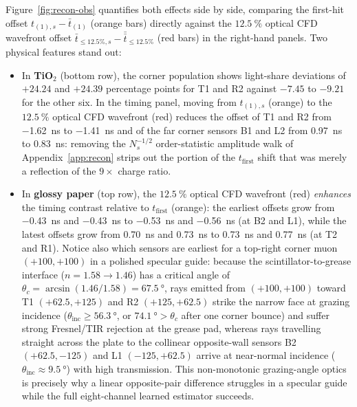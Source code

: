 \documentclass[11pt,a4paper]{article}
\begin{document}
Figure~\ref{fig:recon-obs} quantifies both effects side by side, comparing the
first-hit offset $t_{(1),s} - \bar t_{(1)}$ (orange bars) directly against the
$\SI{12.5}{\percent}$ optical CFD wavefront offset
$\bar t_{\le 12.5\%,s} - \bar{\bar t}_{\le 12.5\%}$ (red bars) in the right-hand
panels.  Two physical features stand out:
\begin{itemize}
  \item In \textbf{TiO$_2$} (bottom row), the corner population shows light-share
        deviations of $+24.24$ and $+24.39$ percentage points for T1 and R2 against
        $-7.45$ to $-9.21$ for the other six.  In the timing panel, moving from
        $t_{(1),s}$ (orange) to the $\SI{12.5}{\percent}$ optical CFD wavefront
        (red) reduces the offset of T1 and R2 from \SI{-1.62}{\nano\second} to
        \SI{-1.41}{\nano\second} and of the far corner sensors B1 and L2 from
        \SI{+0.97}{\nano\second} to \SI{+0.83}{\nano\second}: removing the
        $N_s^{-1/2}$ order-statistic amplitude walk of
        Appendix~\ref{app:recon}
        strips out the portion of the $t_{\mathrm{first}}$ shift that was merely
        a reflection of the $9\times$ charge ratio.
  \item In \textbf{glossy paper} (top row), the $\SI{12.5}{\percent}$ optical
        CFD wavefront (red) \emph{enhances} the timing contrast relative to
        $t_{\mathrm{first}}$ (orange): the earliest offsets grow from
        \SI{-0.43}{\nano\second} and \SI{-0.43}{\nano\second} to
        \SI{-0.53}{\nano\second} and \SI{-0.56}{\nano\second} (at B2 and L1),
        while the latest offsets grow from \SI{+0.70}{\nano\second} and
        \SI{+0.73}{\nano\second} to \SI{+0.73}{\nano\second} and
        \SI{+0.77}{\nano\second} (at T2 and R1).  Notice also which sensors are
        earliest for a top-right corner muon $(+100,+100)$ in a polished
        specular guide: because the scintillator-to-grease interface
        ($n = 1.58 \to 1.46$) has a critical angle of
        $\theta_c = \arcsin(1.46/1.58) = \SI{67.5}{\degree}$, rays emitted from
        $(+100,+100)$ toward T1 $(+62.5,+125)$ and R2 $(+125,+62.5)$ strike the
        narrow face at grazing incidence ($\theta_{\mathrm{inc}} \ge \SI{56.3}{\degree}$,
        or $\SI{74.1}{\degree} > \theta_c$ after one corner bounce) and suffer
        strong Fresnel/TIR rejection at the grease pad, whereas rays travelling
        straight across the plate to the collinear opposite-wall sensors B2
        $(+62.5,-125)$ and L1 $(-125,+62.5)$ arrive at near-normal incidence
        ($\theta_{\mathrm{inc}} \approx \SI{9.5}{\degree}$) with high
        transmission.  This non-monotonic grazing-angle optics is precisely why
        a linear opposite-pair difference struggles in a specular guide while the
        full eight-channel learned estimator succeeds.
\end{itemize}
\end{document}
